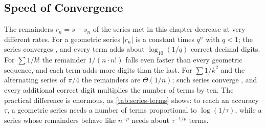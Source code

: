 \subsection{Speed of Convergence}

The remainders $r_n=s-s_n$ of the series met in this chapter decrease at very different rates. For a geometric series $|r_n|$ is a constant times $q^n$ with $q<1$; the series converges , and every term adds about $\log_{10}(1/q)$ correct decimal digits. For $\sum1/k!$ the remainder $1/(n\cdot n!)$ falls even faster than every geometric sequence, and each term adds more digits than the last. For $\sum1/k^2$ and the alternating series of $\pi/4$ the remainders are $\Theta(1/n)$; such series converge , and every additional correct digit multiplies the number of terms by ten. The practical difference is enormous, as \cref{tab:series-terms} shows: to reach an accuracy $\tau$, a geometric series needs a number of terms proportional to $\log(1/\tau)$, while a series whose remainders behave like $n^{-p}$ needs about $\tau^{-1/p}$ terms.

\begin{table}
\end{table}

